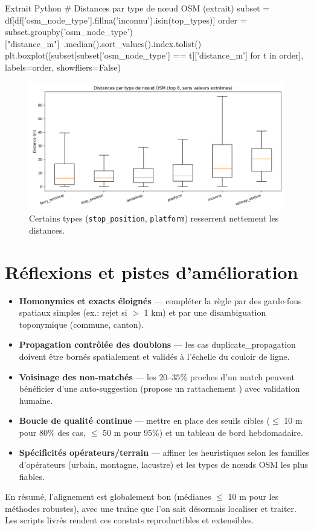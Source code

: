 \begin{codebox}[language=Python]{Extrait Python}
# Distances par type de nœud OSM (extrait)
subset = df[df['osm_node_type'].fillna('inconnu').isin(top_types)]
order = subset.groupby('osm_node_type')["distance_m"]\
         .median().sort_values().index.tolist()
plt.boxplot([subset[subset['osm_node_type'] == t]['distance_m'] for t in order],
            labels=order, showfliers=False)
\end{codebox}

\begin{figure}[H]
    \centering
    \includegraphics[width=\textwidth]{../figures/chap5/distances_by_osm_node_type_box.png}
    \caption[Par type de nœud OSM]{Certains types (\texttt{stop\_position}, \texttt{platform}) resserrent nettement les distances.}
\end{figure}

\section{Réflexions et pistes d'amélioration}

\begin{itemize}
    \item \textbf{Homonymies et \og exacts \fg{} éloignés} — compléter la règle par des garde-fous spatiaux simples (ex.: rejet si \(>\) 1 km) et par une disambiguation toponymique (commune, canton).
    \item \textbf{Propagation contrôlée des doublons} — les cas \og duplicate\_propagation \fg{} doivent être bornés spatialement et validés à l'échelle du couloir de ligne.
    \item \textbf{Voisinage des non-matchés} — les \(20\)–\(35\%\) proches d'un match peuvent bénéficier d'une auto-suggestion (\og propose un rattachement \fg{}) avec validation humaine.
    \item \textbf{Boucle de qualité continue} — mettre en place des seuils cibles (\(\leq\) 10 m pour 80\% des cas, \(\leq\) 50 m pour 95\%) et un tableau de bord hebdomadaire.
    \item \textbf{Spécificités opérateurs/terrain} — affiner les heuristiques selon les familles d'opérateurs (urbain, montagne, lacustre) et les types de nœuds OSM les plus fiables.
\end{itemize}

En résumé, l'alignement est globalement bon (médianes \(\leq\) 10 m pour les méthodes robustes), avec une traîne que l'on sait désormais 
localiser et traiter. Les scripts livrés rendent ces constats reproductibles et extensibles.


